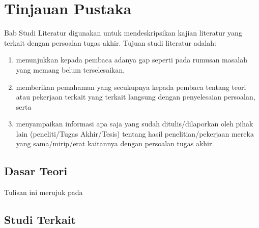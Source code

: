\chapter{Tinjauan Pustaka}

Bab Studi Literatur digunakan untuk mendeskripsikan kajian literatur yang terkait dengan persoalan tugas akhir. Tujuan studi literatur adalah:

\begin{enumerate}
    \item menunjukkan kepada pembaca adanya gap seperti pada rumusan masalah yang memang belum terselesaikan,
    \item memberikan pemahaman yang secukupnya kepada pembaca tentang teori atau pekerjaan terkait yang terkait langsung dengan penyelesaian persoalan, serta
    \item menyampaikan informasi apa saja yang sudah ditulis/dilaporkan oleh pihak lain (peneliti/Tugas Akhir/Tesis) tentang hasil penelitian/pekerjaan mereka yang sama/mirip/erat kaitannya dengan persoalan tugas akhir.
\end{enumerate}

\section{Dasar Teori}
\blindtext
Tulisan ini merujuk pada \parencite{knuth2001art}

\section{Studi Terkait}
\blindtext
